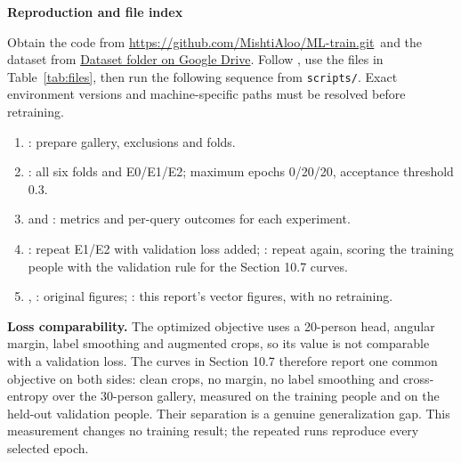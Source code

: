 \documentclass[11pt,a4paper]{article}
\newcommand{\code}[1]{\texttt{#1}}
\newcommand{\datasetlink}{\href{https://drive.google.com/drive/u/1/folders/1XN55OGpozy5Rhbs5QRFMatlCMTAo8sPu}{Dataset folder on Google Drive}}
\newcommand{\codeurl}{\url{https://github.com/MishtiAloo/ML-train.git}}
\newcommand{\cont}[1]{\par{\sffamily\bfseries #1}\par}
\newcommand{\nextpage}{\clearpage}
\begin{document}
\cont{Reproduction and file index}
Obtain the code from \codeurl\ and the dataset from \datasetlink. Follow , use the files in Table~\ref{tab:files}, then run the following sequence from \code{scripts/}. Exact environment versions and machine-specific paths must be resolved before retraining.
\begin{enumerate}[label=\arabic*.,itemsep=1pt]
\item {}: prepare gallery, exclusions and folds.
\item {}: all six folds and E0/E1/E2; maximum epochs 0/20/20, acceptance threshold 0.3.
\item {} and : metrics and per-query outcomes for each experiment.
\item {}: repeat E1/E2 with validation loss added; : repeat again, scoring the training people with the validation rule for the Section 10.7 curves.
\item {}, : original figures; : this report's vector figures, with no retraining.
\end{enumerate}
\textbf{Loss comparability.} The optimized objective uses a 20-person head, angular margin, label smoothing and augmented crops, so its value is not comparable with a validation loss. The curves in Section 10.7 therefore report one common objective on both sides: clean crops, no margin, no label smoothing and cross-entropy over the 30-person gallery, measured on the training people and on the held-out validation people. Their separation is a genuine generalization gap. This measurement changes no training result; the repeated runs reproduce every selected epoch.

\nextpage
\end{document}
